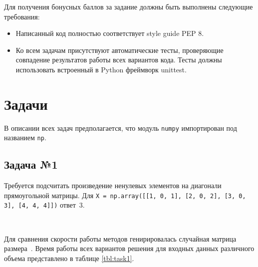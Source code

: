 \documentclass{article}
\begin{document}
Для получения бонусных баллов за задание должны быть выполнены следующие требования:

\begin{itemize}
    \item
    Написанный код полностью соответствует style guide PEP 8.
    \item
    Ко всем задачам присутствуют автоматические тесты, проверяющие совпадение результатов работы всех
    вариантов кода. Тесты должны использовать встроенный в Python фреймворк unittest.
\end{itemize}



\pagebreak
\section{Задачи}
В описании всех задач предполагается, что модуль \verb"numpy" импортирован под названием \verb"np".
\subsection{Задача №1}

\taskdesc 
Требуется подсчитать произведение ненулевых элементов на диагонали прямоугольной матрицы. Для 
\verb"X = np.array([[1, 0, 1], [2, 0, 2], [3, 0, 3], [4, 4, 4]])" ответ~3.

\soldesc\\
\begin{minipage}{\linewidth}

\end{minipage}
\begin{minipage}{\linewidth}

\end{minipage}
\begin{minipage}{\linewidth}

\end{minipage}

\testing
Для сравнения скорости работы методов генирировалась случайная  матрица размера~. 
Время работы всех вариантов решения для входных данных различного объема представлено в таблице \ref{tbl:task1}.
\end{document}
